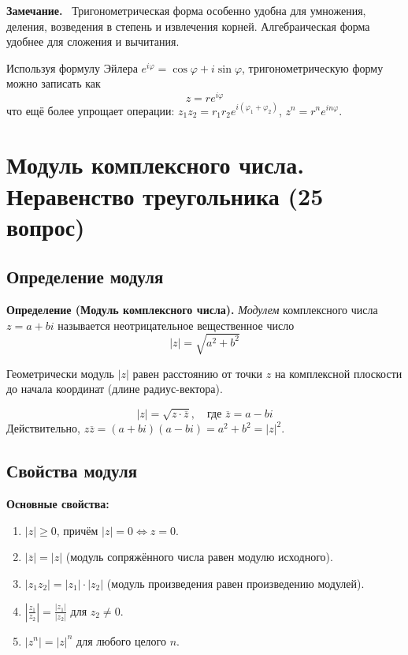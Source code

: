 \documentclass[a4paper,12pt]{article}
\newcommand{\myremark}{\textbf{Замечание.}\ }
\theoremstyle{definition}
\theoremstyle{plain}
\theoremstyle{remark}
\begin{document}
	\myremark
	Тригонометрическая форма особенно удобна для умножения, деления, возведения в степень и извлечения корней. Алгебраическая форма удобнее для сложения и вычитания.
	
	\begin{tcolorbox}[colback=purple!5, colframe=purple!50!black, title=Заметочка: Связь с экспонентой]
		Используя формулу Эйлера $e^{i\varphi} = \cos\varphi + i\sin\varphi$, тригонометрическую форму можно записать как
		\[
		z = r e^{i\varphi}
		\]
		что ещё более упрощает операции: $z_1 z_2 = r_1 r_2 e^{i(\varphi_1+\varphi_2)}$, $z^n = r^n e^{in\varphi}$.
	\end{tcolorbox}
	
	
	
	
	
	\newpage
	\section{Модуль комплексного числа. Неравенство треугольника (25 вопрос)}
	
	\subsection{Определение модуля}
	
	\noindent \textbf{Определение (Модуль комплексного числа).}
	\textit{Модулем} комплексного числа $z = a + bi$ называется неотрицательное вещественное число
	\[
	|z| = \sqrt{a^2 + b^2}
	\]
	
	Геометрически модуль $|z|$ равен расстоянию от точки $z$ на комплексной плоскости до начала координат (длине радиус-вектора).
	
	\begin{tcolorbox}[colback=blue!5, colframe=blue!40!black, title=Связь с сопряжением]
		\[
		|z| = \sqrt{z \cdot \overline{z}},\quad \text{где } \overline{z} = a - bi
		\]
		Действительно, $z\overline{z} = (a+bi)(a-bi) = a^2 + b^2 = |z|^2$.
	\end{tcolorbox}
	
	\subsection{Свойства модуля}
	
	\noindent \textbf{Основные свойства:}
	\begin{enumerate}
		\item $|z| \geq 0$, причём $|z| = 0 \iff z = 0$.
		\item $|\overline{z}| = |z|$ (модуль сопряжённого числа равен модулю исходного).
		\item $|z_1 z_2| = |z_1| \cdot |z_2|$ (модуль произведения равен произведению модулей).
		\item $\left| \frac{z_1}{z_2} \right| = \frac{|z_1|}{|z_2|}$ для $z_2 \neq 0$.
		\item $|z^n| = |z|^n$ для любого целого $n$.
	\end{enumerate}
	
\end{document}
